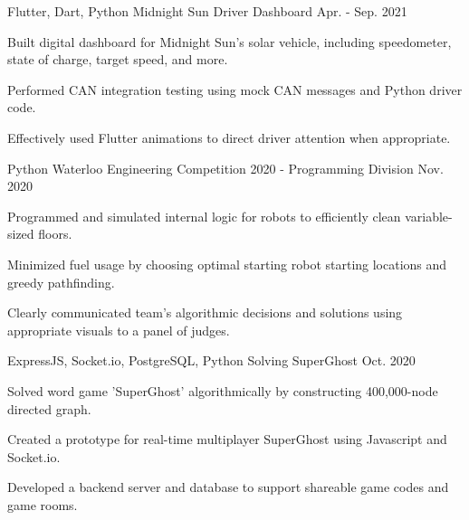

\begin{cventries}

  \cventry
    {Flutter, Dart, Python} %
    {Midnight Sun Driver Dashboard} %
    {} %
    {Apr. - Sep. 2021} %
    {
      \begin{cvitems} %
        \item {Built digital dashboard for Midnight Sun's solar vehicle, including speedometer, state of charge, target speed, and more.}
        \item {Performed CAN integration testing using mock CAN messages and Python driver code.}
        \item {Effectively used Flutter animations to direct driver attention when appropriate.}
      \end{cvitems}
    }

  \cventry
    {Python} %
    {Waterloo Engineering Competition 2020 - Programming Division} %
    {} %
    {Nov. 2020} %
    {
      \begin{cvitems} %
        \item {Programmed and simulated internal logic for robots to efficiently clean variable-sized floors.}
        \item {Minimized fuel usage by choosing optimal starting robot starting locations and greedy pathfinding.}
        \item {Clearly communicated team's algorithmic decisions and solutions using appropriate visuals to a panel of judges.}
      \end{cvitems}
    }

  \cventry
    {ExpressJS, Socket.io, PostgreSQL, Python} %
    {Solving SuperGhost} %
    {} %
    {Oct. 2020} %
    {
      \begin{cvitems} %
        \item {Solved word game 'SuperGhost' algorithmically by constructing 400,000-node directed graph.}
        \item {Created a prototype for real-time multiplayer SuperGhost using Javascript and Socket.io.}
        \item {Developed a backend server and database to support shareable game codes and game rooms.}
      \end{cvitems}
    }


\end{cventries}
